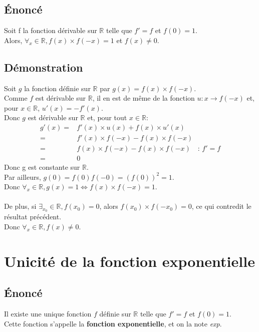 \documentclass[12px]{article}
\begin{document}
	\subsection{\'Enoncé}
	Soit f la fonction dérivable sur $\mathbb{R}$ telle que $f'=f$ et $f(0)=1$.\\
	Alors, $\forall_x\in\mathbb{R}, f(x)\times f(-x)=1$ et $f(x)\not= 0$.
		
	\subsection{Démonstration}
	Soit $g$ la fonction définie sur $\mathbb{R}$ par $g(x)=f(x)\times f(-x)$.\\
	Comme $f$ est dérivable sur $\mathbb{R}$, il en est de même de la fonction $u:x\rightarrow f(-x)$ et, pour $x\in\mathbb{R}$, $u'(x)=-f'(x)$.\\
	Donc $g$ est dérivable sur $\mathbb{R}$ et, pour tout $x\in\mathbb{R}$:
	\begin{align*}
		g'(x)=&f'(x)\times u(x) + f(x)\times u'(x)\\
			 =&f'(x)\times f(-x) - f(x)\times f(-x)\\
			 =&f(x)\times f(-x) - f(x)\times f(-x)\quad :\, f'=f\\
			 =&0
	\end{align*}
	Donc g est constante sur $\mathbb{R}$.\\
	Par ailleurs, $g(0)=f(0)f(-0)=(f(0))^2=1$.\\
	Donc $\forall_x\in \mathbb{R}, g(x)=1 \Leftrightarrow f(x)\times f(-x)=1$.\\
	\\
	De plus, si $\exists_{x_0}\in\mathbb{R}, f(x_0)=0$, alors $f(x_0)\times f(-x_0)=0$, ce qui contredit le résultat précédent.\\
	Donc $\forall_x\in\mathbb{R}, f(x)\not=0$.
	
	
	\newpage
	\section{Unicité de la fonction exponentielle}
	
	\subsection{\'Enoncé}
	Il existe une unique fonction $f$ définie sur $\mathbb{R}$ telle que $f'=f$ et $f(0)=1$.\\
	Cette fonction s'appelle la \textbf{fonction exponentielle}, et on la note \emph{exp}.
	
\end{document}
